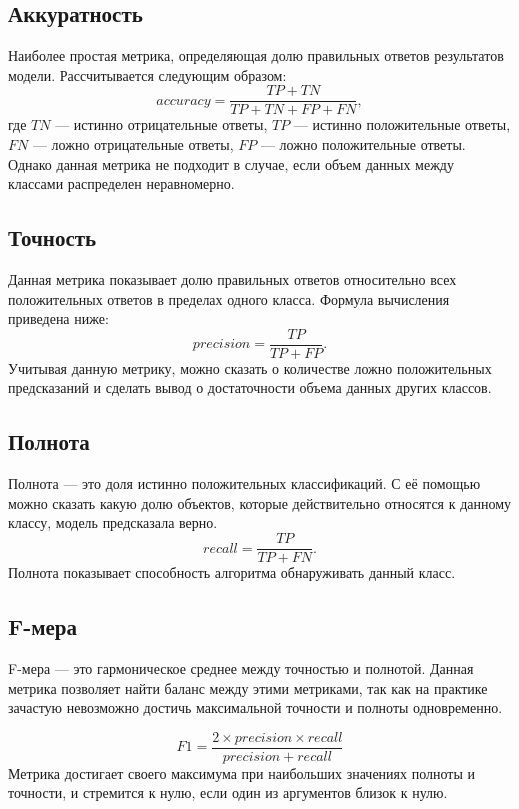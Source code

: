 \subsection{Аккуратность}
Наиболее простая метрика, определяющая долю
правильных ответов результатов модели. Рассчитывается следующим образом:
\begin{equation}
    \label{eq:nn39}
    accuracy = \frac{TP + TN}{TP + TN + FP + FN},
\end{equation}
где $TN$ --- истинно отрицательные ответы, $TP$ --- истинно положительные ответы,
$FN$ --- ложно отрицательные ответы, $FP$ --- ложно положительные ответы. 
Однако данная метрика не подходит в случае, если объем данных между
классами распределен неравномерно.

\subsection{Точность}
Данная метрика показывает долю правильных ответов относительно
всех положительных ответов в пределах одного класса. Формула вычисления приведена ниже:
\begin{equation}
    \label{eq:nn40}
    precision = \frac{TP}{TP + FP}.
\end{equation}
Учитывая данную метрику, можно сказать о количестве ложно
положительных предсказаний и сделать вывод о достаточности объема данных
других классов.

\subsection{Полнота}
Полнота --- это доля истинно положительных классификаций. С её
помощью можно сказать какую долю объектов, которые действительно
относятся к данному классу, модель предсказала верно.
\begin{equation}
    \label{eq:nn41}
    recall = \frac{TP}{TP + FN}.
\end{equation}
Полнота показывает способность алгоритма обнаруживать данный класс.

\subsection{F-мера}
F-мера --- это гармоническое среднее между точностью и полнотой. Данная
метрика позволяет найти баланс между этими метриками, так как на практике
зачастую невозможно достичь максимальной точности и полноты одновременно.

\begin{equation}
    \label{eq:nn42}
    F1 = \frac{2 \times precision \times recall}{precision + recall}
\end{equation}
Метрика достигает своего максимума при наибольших значениях полноты
и точности, и стремится к нулю, если один из аргументов близок к нулю.



